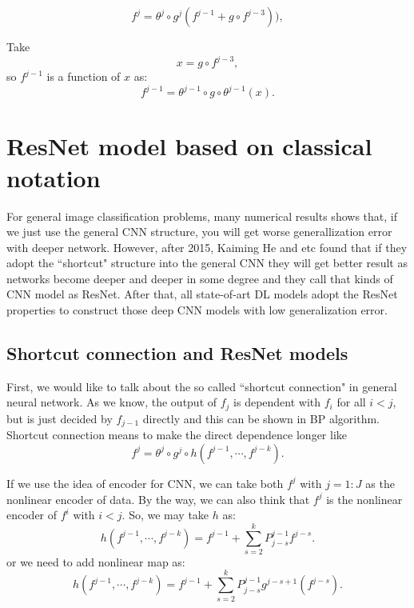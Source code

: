 \bigskip 
\bigskip 
\begin{equation}
f^j = \theta^j \circ g^j(f^{j-1} + g\circ f^{j-3}) ),
\end{equation}

Take 
\begin{equation}
x = g\circ f^{j-3},
\end{equation}
so $f^{j-1}$ is a function of $x$ as:
\begin{equation}
f^{j-1} = \theta^{j-1} \circ g \circ \theta^{j-1} (x).
\end{equation}

\section{ResNet model based on classical notation}
For general image classification problems, many numerical results shows that, if we just use the general CNN structure, you will get worse generallization error with deeper network. However, after 2015, Kaiming He and etc found that if they adopt the ``shortcut" structure into the general CNN they will get better result as networks become deeper and deeper in some degree and they call that kinds of CNN model as ResNet. After that, all state-of-art DL models adopt the ResNet properties to construct those deep CNN models with low generalization error. 

\subsection{Shortcut connection and ResNet models}
First, we would like to talk about the so called ``shortcut connection" in general neural network. As we know, the output of $f_j$ is dependent with $f_i$ for all $ i < j$, but is just decided by $f_{j-1}$ directly and this can be shown in BP algorithm. Shortcut connection means to make the direct dependence longer like 
\begin{equation}
f^j = \theta^j \circ g^j \circ h( f^{j-1}, \cdots, f^{j-k}).
\end{equation} 

If we use the idea of encoder for CNN, we can take both $f^j$ with $j = 1:J$ as the nonlinear encoder of data. By the way, we can also think that $f^j$ is the nonlinear encoder of $f^i$ with $i < j$.  So, we may take $h$ as:
\begin{equation}
h(f^{j-1}, \cdots, f^{j-k}) = f^{j-1} + \sum_{s = 2}^k P_{j-s}^{j-1} f^{j-s}.
\end{equation}
or we need to add nonlinear map as:
\begin{equation}
h(f^{j-1}, \cdots, f^{j-k}) = f^{j-1} + \sum_{s = 2}^k P_{j-s}^{j-1} g^{j-s+1}(f^{j-s}).
\end{equation}





